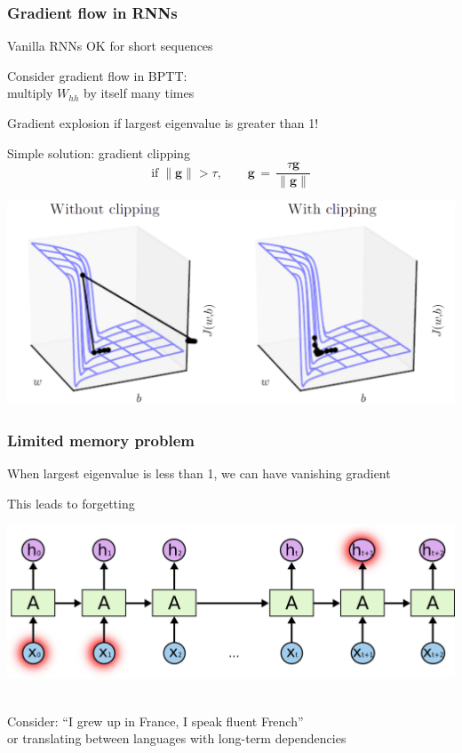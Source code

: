 \documentclass[xcolor=dvipsnames]{beamer}
\begin{document}
\begin{frame}
  \frametitle{Gradient flow in RNNs}
  \bi
\item Vanilla RNNs OK for short sequences
\item Consider gradient flow in BPTT:\\
multiply $W_{hh}$ by itself many times
\item Gradient explosion if largest eigenvalue is greater than 1!
\item Simple solution: gradient clipping
\[\text{if}\;\|\mathbf{g}\|>\tau,\qquad\mathbf{g}\,=\,\frac{\tau\mathbf{g}}{\|\mathbf{g}\|}
\]

\includegraphics[width=.7\textwidth]{gcb-grad-clip}\raisebox{1em}{[Goodfellow
  et al.]}

\ei
\end{frame}

\begin{frame}
  \frametitle{Limited memory problem}
  \bi
\item When largest eigenvalue is less than 1, we can have vanishing
  gradient
\item This leads to forgetting

\includegraphics[width=.7\textwidth]{olah-lstm/RNN-longtermdependencies}~\raisebox{1em}{[C. Olah]}
\item Consider: ``I grew up in France, I speak fluent French''\\
or translating between languages with long-term dependencies
\ei
\end{frame}
\end{document}
